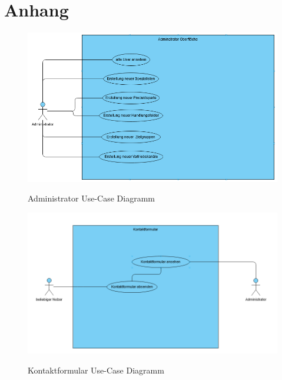 \section*{Anhang}

\anhangsverzeichnis

\label{Anhang-Use-Cases}

\label{Anhang-Admin}
\begin{figure}[h]
\centering
\begin{minipage}[t]{1\textwidth} 
\caption{Administrator Use-Case Diagramm} 
\includegraphics[width=1\textwidth]{img/admin-use-case.png}\\
\end{minipage}
\end{figure}

\label{Anhang-Kontakt}
\begin{figure}[h]
\centering
\begin{minipage}[t]{1\textwidth} 
\caption{Kontaktformular Use-Case Diagramm} 
\includegraphics[width=1\textwidth]{img/kontakt-use-case.png}\\
\end{minipage}
\end{figure}

